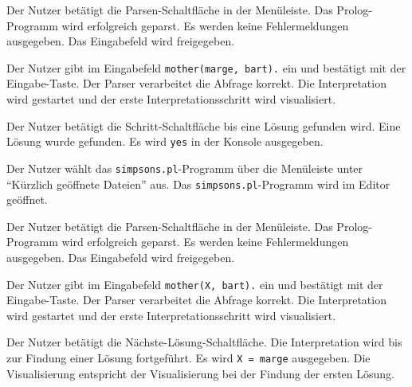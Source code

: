 \documentclass[parskip=full,11pt,twoside]{scrartcl}
\begin{document}
{Der Nutzer betätigt die Parsen-Schaltfläche in der Menüleiste.}
{Das Prolog-Programm wird erfolgreich geparst. Es werden keine Fehlermeldungen ausgegeben. Das Eingabefeld wird freigegeben.}

{Der Nutzer gibt im Eingabefeld \texttt{mother(marge, bart).} ein und bestätigt mit der Eingabe-Taste.}
{Der Parser verarbeitet die Abfrage korrekt. Die Interpretation wird gestartet und der erste Interpretationsschritt wird visualisiert.}

{Der Nutzer betätigt die Schritt-Schaltfläche bis eine Lösung gefunden wird.}
{Eine Lösung wurde gefunden. Es wird \texttt{yes} in der Konsole ausgegeben.}


{Der Nutzer wählt das \texttt{simpsons.pl}-Programm über die Menüleiste unter \enquote{Kürzlich geöffnete Dateien} aus.}
{Das \texttt{simpsons.pl}-Programm wird im Editor geöffnet.}

{Der Nutzer betätigt die Parsen-Schaltfläche in der Menüleiste.}
{Das Prolog-Programm wird erfolgreich geparst. Es werden keine Fehlermeldungen ausgegeben. Das Eingabefeld wird freigegeben.}

{Der Nutzer gibt im Eingabefeld \texttt{mother(X, bart).} ein und bestätigt mit der Eingabe-Taste.}
{Der Parser verarbeitet die Abfrage korrekt. Die Interpretation wird gestartet und der erste Interpretationsschritt wird visualisiert.}

{Der Nutzer betätigt die Nächste-Lösung-Schaltfläche.}
{Die Interpretation wird bis zur Findung einer Lösung fortgeführt. Es wird \texttt{X = marge} ausgegeben. Die Visualisierung entspricht der Visualisierung bei der Findung der ersten Lösung.}
\end{document}
